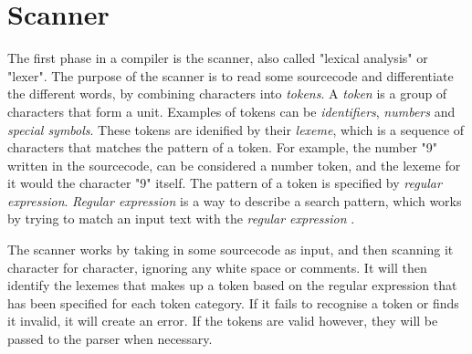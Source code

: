 \section{Scanner} \label{chap:scanner}

The first phase in a compiler is the scanner, also called "lexical analysis" or "lexer".
The purpose of the scanner is to read some sourcecode and differentiate the different words, by combining 
characters into \emph{tokens}.
A \emph{token} is a group of characters that form a unit. Examples of tokens can be 
\emph{identifiers}, \emph{numbers} and \emph{special symbols}. 
These tokens are idenified by their \emph{lexeme}, which is a sequence of characters that matches the pattern of a token.
For example, the number "9" written
in the sourcecode, can be considered a number token, and the lexeme for it would the character "9" itself. 
The pattern of a token is specified by \emph{regular expression}.
\emph{Regular expression} is a way to describe a search pattern, which works by trying to match an input
text with the \emph{regular expression} \cite{crafting_a_compiler}.

The scanner works by taking in some sourcecode as input, and then scanning it character for character, 
ignoring any white space or comments. It will then identify the lexemes that makes up a token
based on the regular expression that has been specified for each token category. If it fails to recognise 
a token or finds it invalid, it will create an error. If the tokens are valid however, they
will be passed to the parser when necessary. 







